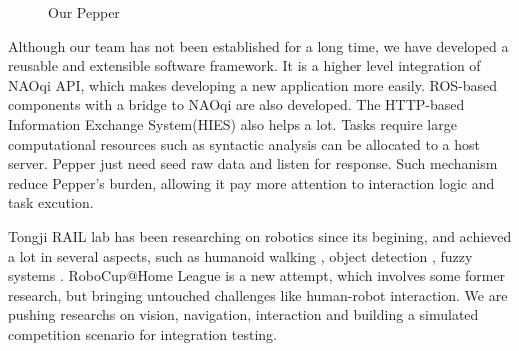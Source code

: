\begin{figure}[!h]

    \centering
    \hspace{0.2in}
    \caption{Our Pepper}
\end{figure}
Although our team has not been established for a long time, we have developed a reusable and extensible software framework. 
It is a higher level integration of NAOqi API, which makes developing a new application more easily. 
ROS-based components with a bridge to NAOqi are also developed. 
The HTTP-based Information Exchange System(HIES) also helps a lot. 
Tasks require large computational resources such as syntactic analysis can be allocated to a host server. 
Pepper just need seed raw data and listen for response. Such mechanism reduce Pepper’s burden, allowing it pay more attention to interaction logic and task excution. 

Tongji RAIL lab has been researching on robotics since its begining, and achieved a lot in several aspects, such as humanoid walking \cite{rebalancecontrol,CPG}, object detection \cite{FocalLoss}, fuzzy systems \cite{Zhang2018A}. 
RoboCup@Home League is a new attempt, which involves some former research, but bringing untouched challenges like human-robot interaction. 
We are pushing researchs on vision, navigation, interaction and building a simulated competition scenario for integration testing.
